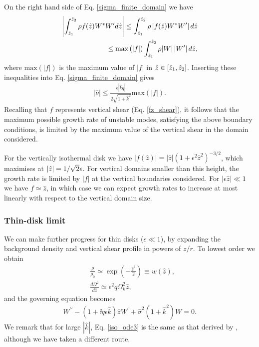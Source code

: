 On the right hand side of Eq. \ref{sigma_finite_domain} we have
\begin{align}
  \left|\int_{\hat{z}_1}^{\hat{z}_2}\rho
    f(\hat{z}) W^*W^\prime d\hat{z}\right|\leq \int_{\hat{z}_1}^{\hat{z}_2}\rho
  \left|f(\hat{z})W^*W^\prime \right|d\hat{z} \notag\\
  \leq
  \mathrm{max}\left(|f|\right)\int_{\hat{z}_1}^{\hat{z}_2}\rho
  |W|\left|W^\prime \right|d\hat{z},
\end{align}
where $\mathrm{max}(|f|)$ is the maximum value of $|f|$ in
$\hat{z}\in[\hat{z}_1,\hat{z}_2]$. Inserting these inequalities into
Eq. \ref{sigma_finite_domain} gives
\begin{align}\label{max_growth}
  |\hat{\nu}|\leq
  \frac{\epsilon |\hat{k} q|}{2\sqrt{1+\hat{k}^2}}\mathrm{max}(|f|). 
\end{align}
Recalling that $f$ represents vertical shear (Eq. \ref{fz_shear}), it
follows that the maximum possible growth rate of unstable modes,
satisfying the above boundary conditions, is limited by the maximum
value of the vertical shear in the domain considered. 

For the vertically isothermal disk we have $|f(\hat{z})| =
|\hat{z}|\left(1+\epsilon^2\hat{z}^2\right)^{-3/2}$, which maximises
at $|\hat{z}|=1/\sqrt{2}\epsilon$. For vertical domains smaller 
than this height, the growth rate is limited by $|f|$ at the vertical
boundaries considered. For $|\epsilon\hat{z}|\ll1$ we have $f\simeq
\hat{z}$, in which case we can expect growth rates to increase at most linearly
with respect to the vertical domain size.   %



\subsubsection{Thin-disk limit}
We can make further progress for thin disks ($\epsilon\ll1$), 
by expanding the background density and vertical shear profile in powers
of $z/r$. To lowest order we obtain 
\begin{align}
  &\frac{\rho}{\rho_0} \simeq 
  \exp{\left(-\frac{\hat{z}^2}{2}\right)} \equiv w(\hat{z}),\label{thin_dens}\\
  &\frac{d\Omega^2}{d\hat{z}} \simeq \epsilon^2q\Omega_k^2\hat{z}, \label{thin_vshear}
\end{align} 
and the governing equation becomes 
\begin{align}\label{iso_ode3}
  W^{\prime\prime} - \left(1 + \ii q\epsilon
    \hat{k}\right)\hat{z}W^\prime  +
  \hat{\sigma}^2\left(1+\hat{k}^2\right)W = 
  0.
\end{align}
We remark that for large $|\hat{k}|$, Eq. \ref{iso_ode3} is the same as
that derived by \cite{nelson13}, although we have taken a different
route.  

